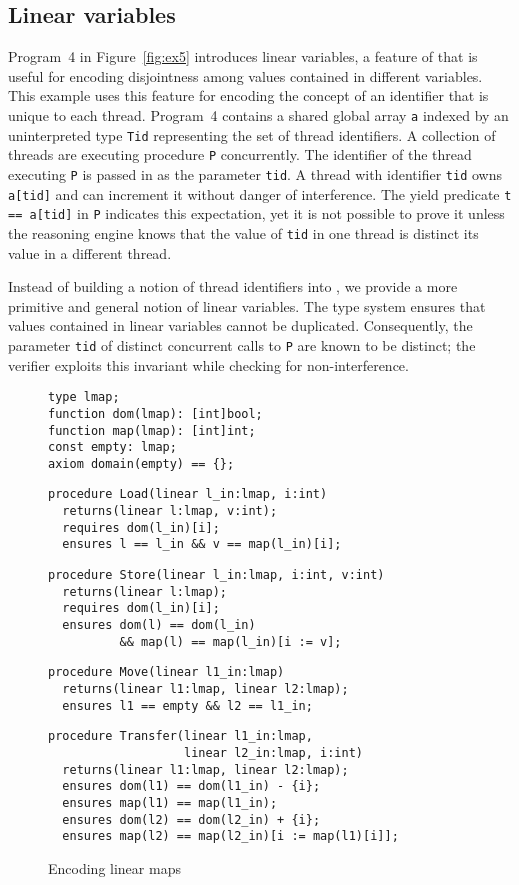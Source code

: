 \subsection{Linear variables}

Program~4 in Figure~\ref{fig:ex5} introduces linear variables, a feature of \civl 
that is useful for encoding disjointness among values contained in 
different variables.  
This example uses this feature for encoding the concept of an identifier 
that is unique to each thread.
Program~4 contains a shared global array {\tt a} indexed by an uninterpreted type {\tt Tid} 
representing the set of thread identifiers.
A collection of threads are executing procedure {\tt P} concurrently.
The identifier of the thread executing {\tt P} is passed in as the parameter {\tt tid}.
A thread with identifier {\tt tid} owns {\tt a[tid]} and can increment it without danger of interference.
The yield predicate {\tt t == a[tid]} in {\tt P} indicates this expectation, yet it is not possible to prove it 
unless the reasoning engine knows that the value of {\tt tid} in one thread is distinct 
its value in a different thread.

Instead of building a notion of thread identifiers into \civl, we provide a more 
primitive and general notion of linear variables.
The \civl type system ensures that values contained in linear variables cannot be duplicated.
Consequently, the parameter {\tt tid} of distinct concurrent calls to {\tt P} are known to be distinct;
the \civl verifier exploits this invariant while checking for non-interference.

\begin{figure}
\begin{verbatim}
type lmap;
function dom(lmap): [int]bool;
function map(lmap): [int]int;
const empty: lmap;
axiom domain(empty) == {};
\end{verbatim}
\begin{verbatim}
procedure Load(linear l_in:lmap, i:int) 
  returns(linear l:lmap, v:int);
  requires dom(l_in)[i];
  ensures l == l_in && v == map(l_in)[i];
\end{verbatim}
\begin{verbatim}
procedure Store(linear l_in:lmap, i:int, v:int) 
  returns(linear l:lmap);
  requires dom(l_in)[i];
  ensures dom(l) == dom(l_in) 
          && map(l) == map(l_in)[i := v];
\end{verbatim}
\begin{verbatim}
procedure Move(linear l1_in:lmap) 
  returns(linear l1:lmap, linear l2:lmap);
  ensures l1 == empty && l2 == l1_in;
\end{verbatim}
\begin{verbatim}
procedure Transfer(linear l1_in:lmap, 
                   linear l2_in:lmap, i:int) 
  returns(linear l1:lmap, linear l2:lmap);
  ensures dom(l1) == dom(l1_in) - {i};
  ensures map(l1) == map(l1_in);
  ensures dom(l2) == dom(l2_in) + {i};
  ensures map(l2) == map(l2_in)[i := map(l1)[i]];
\end{verbatim}
\caption{Encoding linear maps}
\label{fig:linear-maps}
\end{figure}

